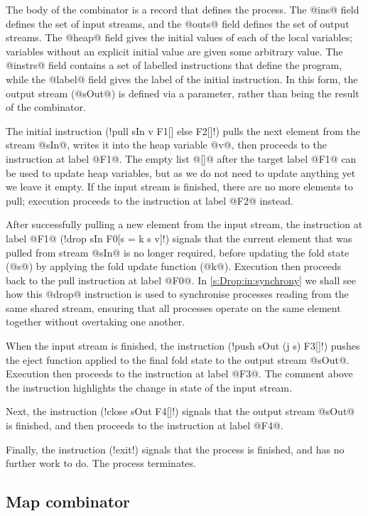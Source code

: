 The body of the combinator is a record that defines the process.
The @ins@ field defines the set of input streams, and the @outs@ field defines the set of output streams.
The @heap@ field gives the initial values of each of the local variables; variables without an explicit initial value are given some arbitrary value.
The @instrs@ field contains a set of labelled instructions that define the program, while the @label@ field gives the label of the initial instruction.
In this form, the output stream (@sOut@) is defined via a parameter, rather than being the result of the combinator.

The initial instruction (\lstiproc!pull sIn v F1[] else F2[]!) pulls the next element from the stream @sIn@, writes it into the heap variable @v@, then proceeds to the instruction at label @F1@.
The empty list @[]@ after the target label @F1@ can be used to update heap variables, but as we do not need to update anything yet we leave it empty. 
If the input stream is finished, there are no more elements to pull; execution proceeds to the instruction at label @F2@ instead.

After successfully pulling a new element from the input stream, the instruction at label @F1@ (\lstiproc!drop sIn F0[s = k s v]!) signals that the current element that was pulled from stream @sIn@ is no longer required, before updating the fold state (@s@) by applying the fold update function (@k@).
Execution then proceeds back to the pull instruction at label @F0@.
In \cref{s:Drop:in:synchrony} we shall see how this @drop@ instruction is used to synchronise processes reading from the same shared stream, ensuring that all processes operate on the same element together without overtaking one another.

When the input stream is finished, the instruction (\lstiproc!push sOut (j s) F3[]!) pushes the eject function applied to the final fold state to the output stream @sOut@.
Execution then proceeds to the instruction at label @F3@.
The comment above the instruction highlights the change in state of the input stream.

Next, the instruction (\lstiproc!close sOut F4[]!) signals that the output stream @sOut@ is finished, and then proceeds to the instruction at label @F4@.

Finally, the instruction (\lstiproc!exit!) signals that the process is finished, and has no further work to do.
The process terminates.

\subsection{Map combinator}

